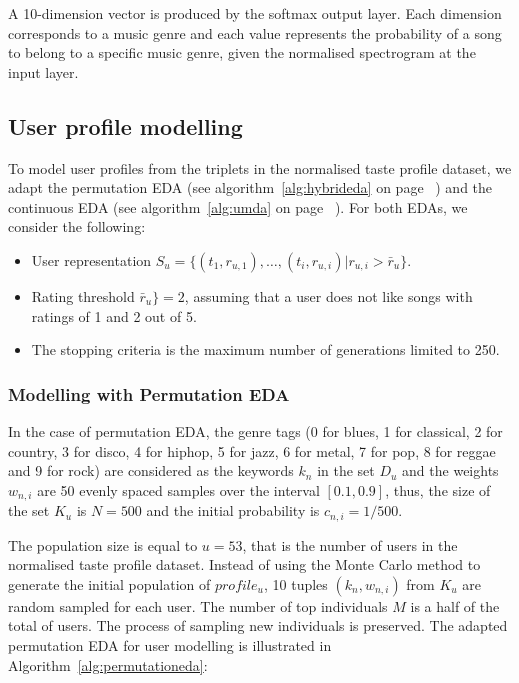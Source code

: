 A 10-dimension vector is produced by the softmax output layer. Each dimension corresponds to a music genre and each value represents the probability of a song to belong to a specific music genre, given the normalised spectrogram at the input layer.

\subsection{User profile modelling}
\label{subsec:profile}
To model user profiles from the triplets in the normalised taste profile dataset, we adapt the permutation EDA (see algorithm~\ref{alg:hybrideda} on page ~\pageref{alg:hybrideda}) and the continuous EDA (see algorithm~\ref{alg:umda} on page ~\pageref{alg:umda}). For both EDAs, we consider the following:
\begin{itemize}
	\item User representation $S_u=\{(t_1, r_{u,1}),\ldots,(t_i, r_{u,i})\vert r_{u,i}>\bar r_{u}\}$.
	\item Rating threshold $\bar r_{u}\}=2$, assuming that a user does not like songs with ratings of 1 and 2 out of 5.
	\item The stopping criteria is the maximum number of generations limited to 250.
\end{itemize}


\subsubsection{Modelling with Permutation EDA}
In the case of permutation EDA, the genre tags (0 for blues, 1 for classical, 2 for country, 3 for disco, 4 for hiphop, 5 for jazz, 6 for metal, 7 for pop, 8 for reggae and 9 for rock) are considered as the keywords $k_n$ in the set $D_u$ and the weights $w_{n,i}$ are 50 evenly spaced samples over the interval $[0.1, 0.9]$, thus, the size of the set $K_u$ is $N=500$ and the initial probability is $c_{n,i}=1/500$.

The population size is equal to $u=53$, that is the number of users in the normalised taste profile dataset. Instead of using the Monte Carlo method to generate the initial population of $profile_u$, 10 tuples $(k_n,w_{n,i})$ from $K_u$ are random sampled for each user. The number of top individuals $M$ is a half of the total of users. The process of sampling new individuals is preserved. The adapted permutation EDA for user modelling is illustrated in Algorithm~\ref{alg:permutationeda}:

